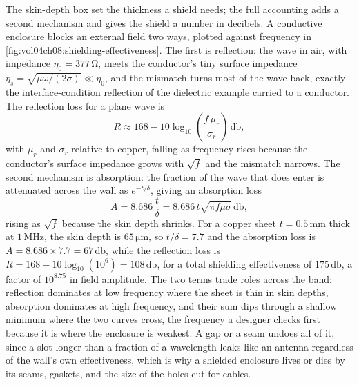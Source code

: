 The skin-depth box set the thickness a shield needs; the full accounting adds
a second mechanism and gives the shield a number in decibels. A conductive
enclosure blocks an external field two ways, plotted against frequency in
\cref{fig:vol04ch08:shielding-effectiveness}. The first is reflection: the
wave in air, with impedance $\eta_0 = 377\,\si{\ohm}$, meets the conductor's
tiny surface impedance $\eta_s = \sqrt{\mu\omega/(2\sigma)}\ll\eta_0$, and the
mismatch turns most of the wave back, exactly the interface-condition
reflection of the dielectric example carried to a conductor. The reflection
loss for a plane wave is
\[
R \approx 168 - 10\log_{10}\!\left(\frac{f\,\mu_r}{\sigma_r}\right)\,\si{
\decibel},
\]
with $\mu_r$ and $\sigma_r$ relative to copper, falling as frequency rises
because the conductor's surface impedance grows with $\sqrt{f}$ and the
mismatch narrows. The second mechanism is absorption: the fraction of the
wave that does enter is attenuated across the wall as $e^{-t/\delta}$, giving
an absorption loss
\[
A = 8.686\,\frac{t}{\delta} = 8.686\,t\sqrt{\pi f\mu\sigma}\,\si{\decibel},
\]
rising as $\sqrt{f}$ because the skin depth shrinks. For a copper sheet
$t = 0.5\,\si{\milli\meter}$ thick at $1\,\si{\mega\hertz}$, the skin depth is
$65\,\si{\micro\meter}$, so $t/\delta = 7.7$ and the absorption loss is
$A = 8.686\times 7.7 = 67\,\si{\decibel}$, while the reflection loss is
$R = 168 - 10\log_{10}(10^{6}) = 108\,\si{\decibel}$, for a total shielding
effectiveness of $175\,\si{\decibel}$, a factor of $10^{8.75}$ in field
amplitude. The two terms trade roles across the band: reflection dominates at
low frequency where the sheet is thin in skin depths, absorption dominates at
high frequency, and their sum dips through a shallow minimum where the two
curves cross, the frequency a designer checks first because it is where the
enclosure is weakest. A gap or a seam undoes all of it, since a slot longer
than a fraction of a wavelength leaks like an antenna regardless of the wall's
own effectiveness, which is why a shielded enclosure lives or dies by its
seams, gaskets, and the size of the holes cut for cables.




